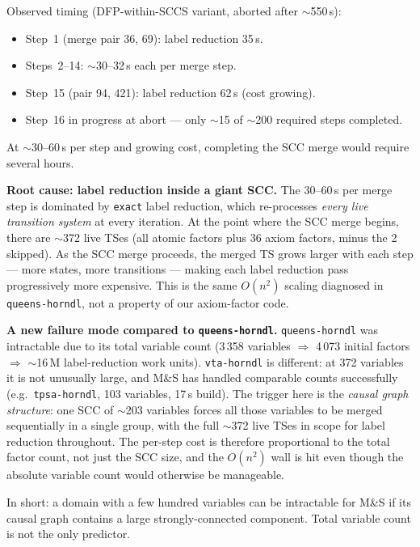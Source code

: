 \documentclass[11pt,a4paper]{article}
\begin{document}
    Observed timing (DFP-within-SCCS variant, aborted after $\sim$550\,s):
    \begin{itemize}
      \item Step~1 (merge pair 36, 69): label reduction 35\,s.
      \item Steps~2--14: $\sim$30--32\,s each per merge step.
      \item Step~15 (pair 94, 421): label reduction 62\,s (cost growing).
      \item Step~16 in progress at abort — only $\sim$15 of $\sim$200
            required steps completed.
    \end{itemize}

    At $\sim$30--60\,s per step and growing cost, completing the SCC merge
    would require several hours.

    \textbf{Root cause: label reduction inside a giant SCC.}  The 30--60\,s
    per merge step is dominated by \texttt{exact} label reduction, which
    re-processes \emph{every live transition system} at every iteration.
    At the point where the SCC merge begins, there are $\sim$372
    live TSes (all atomic factors plus 36 axiom factors, minus the 2
    skipped).  As the SCC merge proceeds, the merged TS grows larger with
    each step — more states, more transitions — making each label reduction
    pass progressively more expensive.  This is the same $O(n^2)$
    scaling diagnosed in \texttt{queens-horndl}, not a property of our
    axiom-factor code.

    \textbf{A new failure mode compared to \texttt{queens-horndl}.}
    \texttt{queens-horndl} was intractable due to its total variable count
    (3\,358 variables $\Rightarrow$ 4\,073 initial factors $\Rightarrow$
    $\sim$16\,M label-reduction work units).  \texttt{vta-horndl} is
    different: at 372 variables it is not unusually large, and M\&S has
    handled comparable counts successfully (e.g.\ \texttt{tpsa-horndl},
    103 variables, 17\,s build).  The trigger here is the \emph{causal
    graph structure}: one SCC of $\sim$203 variables forces all those
    variables to be merged sequentially in a single group, with the full
    $\sim$372 live TSes in scope for label reduction throughout.  The
    per-step cost is therefore proportional to the total factor count, not
    just the SCC size, and the $O(n^2)$ wall is hit even though the
    absolute variable count would otherwise be manageable.

    In short: a domain with a few hundred variables can be intractable
    for M\&S if its causal graph contains a large strongly-connected
    component.  Total variable count is not the only predictor.
\end{document}
